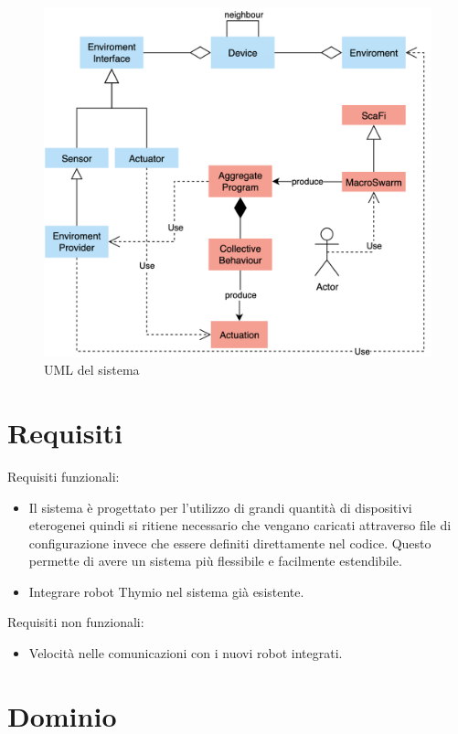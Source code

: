 \documentclass[12pt,a4paper,openright,twoside]{book}
\begin{document}
\begin{figure}
    \centering
    \includegraphics[width=.8\linewidth]{figures/uml.png}
    \caption{UML del sistema}
    \label{fig:uml}
\end{figure}

\section{Requisiti}

Requisiti funzionali:
\begin{itemize}
    \item Il sistema è progettato per l'utilizzo di grandi quantità di dispositivi eterogenei quindi si ritiene necessario che vengano caricati attraverso file di configurazione invece che essere definiti direttamente nel codice. Questo permette di avere un sistema più flessibile e facilmente estendibile.
    \item Integrare robot Thymio nel sistema già esistente.
\end{itemize}

Requisiti non funzionali:
\begin{itemize}
    \item Velocità nelle comunicazioni con i nuovi robot integrati.
\end{itemize}

\section{Dominio}


\end{document}
